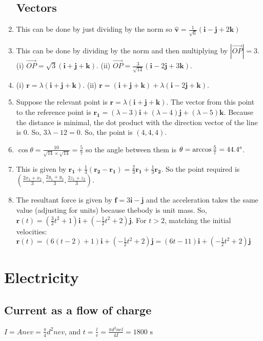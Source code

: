 \documentclass{article}
\begin{document}
\begin{enumerate}
\subsection{Vectors}
    \item This can be done by just dividing by the norm so $\hat{\boldsymbol{v}}=\frac{1}{\sqrt{6}} (\boldsymbol{i}-\boldsymbol{j}+2\boldsymbol{k})$
    \item This can be done by dividing by the norm and then multiplying by $|\vec{OP}|=3$. (i) $\vec{OP}=\sqrt{3}(\boldsymbol{i}+\boldsymbol{j}+\boldsymbol{k})$. (ii) $\vec{OP}=\frac{3}{\sqrt{14}} (\boldsymbol{i}-2\boldsymbol{j}+3\boldsymbol{k})$.
    \item (i) $\boldsymbol{r}=\lambda (\boldsymbol{i}+\boldsymbol{j}+\boldsymbol{k})$. (ii) $\boldsymbol{r}=(\boldsymbol{i}+\boldsymbol{j}+\boldsymbol{k})+\lambda (\boldsymbol{i}-2\boldsymbol{j}+\boldsymbol{k})$.
    \item Suppose the relevant point is $\boldsymbol{r}=\lambda (\boldsymbol{i}+\boldsymbol{j}+\boldsymbol{k})$. The vector from this point to the reference point is $\boldsymbol{r_1}=(\lambda - 3)\boldsymbol{i} + (\lambda-4) \boldsymbol{j}+(\lambda-5)\boldsymbol{k}$. Because the distance is minimal, the dot product with the direction vector of the line is 0. So, $3\lambda-12=0$. So, the point is $(4,4,4)$.
    \item $\cos{\theta}= \frac{10}{\sqrt{14}\times \sqrt{14}}=\frac{5}{7}$ so the angle between them is $\theta = \arccos{\frac{5}{7}}=44.4 \degree$.
    \item This is given by $\boldsymbol{r_1}+\frac{1}{3}(\boldsymbol{r_2}-\boldsymbol{r_1})=\frac{2}{3} \boldsymbol{r_1}+\frac{1}{3} \boldsymbol{r_2}$. So the point required is $(\frac{2x_1+x_2}{3},\frac{2y_1+y_2}{3},\frac{2z_1+z_2}{3})$.
    \item The resultant force is given by $\boldsymbol{f}=3\boldsymbol{i}-\boldsymbol{j}$ and the acceleration takes the same value (adjusting for units) because thebody is unit mass. So, $\boldsymbol{r}(t)=(\frac{3}{2}t^2 + 1)\boldsymbol{i} + (-\frac{1}{2}t^2 +2)\boldsymbol{j}$. For $t>2$, matching the initial velocities: $\boldsymbol{r}(t)=(6(t-2)+1)\boldsymbol{i}+(-\frac{1}{2}t^2 +2)\boldsymbol{j}=(6t-11)\boldsymbol{i}+(-\frac{1}{2}t^2 +2)\boldsymbol{j}$
\end{enumerate}
\newpage
\section{Electricity}
\subsection{Current as a flow of charge}
$I=Anev=\frac{\pi}{4}d^2 nev$, and $t=\frac{l}{v}=\frac{\pi d^2 nel}{4I}=1800 \text{ s}$
\end{document}
